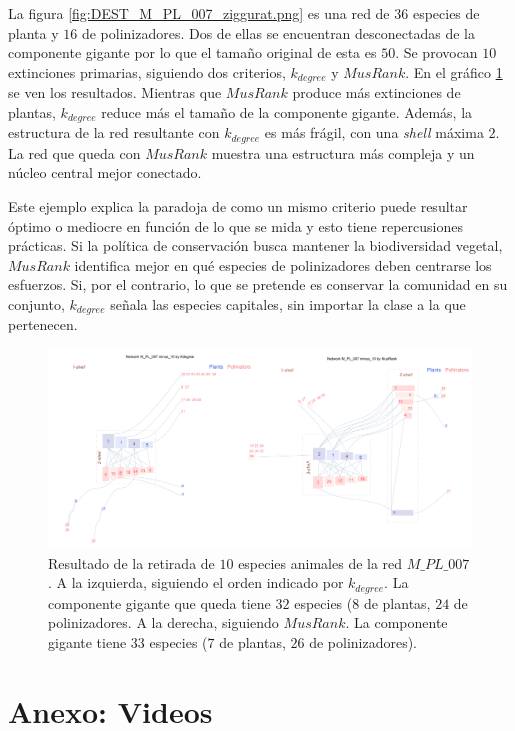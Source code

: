 La figura \ref{fig:DEST_M_PL_007_ziggurat.png} es una red de $36$ especies de planta y $16$ de polinizadores. Dos de ellas se encuentran desconectadas de la componente gigante por lo que el tamaño original de esta es $50$. Se provocan $10$ extinciones primarias, siguiendo dos criterios, ${k}_{degree}$ y $MusRank$. En el gráfico \ref{fig:DEST_destruccion_PL007.png} se ven los resultados. Mientras que $MusRank$ produce más extinciones de plantas, ${k}_{degree}$ reduce más el tamaño de la componente gigante. Además, la estructura de la red resultante con ${k}_{degree}$ es más frágil, con una \textit{shell} máxima $2$. La red que queda con $MusRank$ muestra una estructura más compleja y un núcleo central mejor conectado.

Este ejemplo explica la paradoja de como un mismo criterio puede resultar óptimo o mediocre en función de lo que se mida y esto tiene repercusiones prácticas. Si la política de conservación busca mantener la biodiversidad vegetal, $MusRank$  identifica mejor en qué especies de polinizadores deben
centrarse los esfuerzos. Si, por el contrario, lo que se pretende es conservar la comunidad en su conjunto, ${k}_{degree}$ señala las especies capitales, sin importar la clase a la que pertenecen.

\begin{figure}[htp!]
\centering
\includegraphics[scale=0.26]{Figures/DEST_destruccion_PL007.png}
\caption {Resultado de la retirada de $10$ especies animales de la red $M\_PL\_007$. A la izquierda, siguiendo el orden indicado por ${k}_{degree}$. La componente gigante que queda tiene $32$ especies ($8$ de plantas, $24$ de polinizadores. A la derecha, siguiendo $MusRank$. La componente gigante tiene $33$ especies ($7$ de plantas, $26$ de polinizadores).}
\label{fig:DEST_destruccion_PL007.png}
\end{figure}

\section{Anexo: Videos}
\label{DES_ANEXO_videos}

